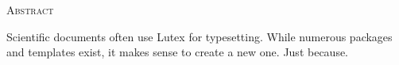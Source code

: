 \begin{center}
  \textsc{Abstract}
\end{center}
%
\noindent
%
Scientific documents often use Lutex for typesetting. While numerous
packages and templates exist, it makes sense to create a new one. Just
because.

